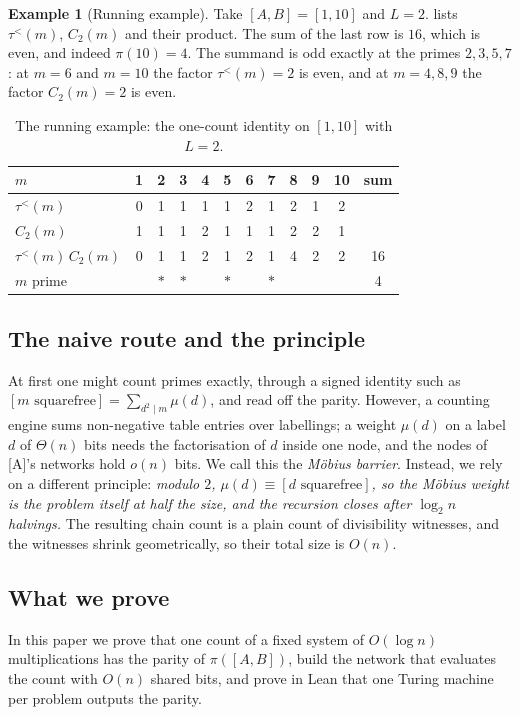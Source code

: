 \documentclass[10pt]{amsart}
\theoremstyle{plain}
\theoremstyle{definition}
\newtheorem{example}[theorem]{Example}
\theoremstyle{remark}
\numberwithin{equation}{section}
\newcommand{\A}{\textup{[A]}}
\newcommand{\tl}{\tau^{<}}
\begin{document}
\begin{example}[Running example]\label{ex:ten}
Take $[A,B]=[1,10]$ and $L=2$.  lists $\tl(m)$, $C_2(m)$ and their product. The sum of
the last row is $16$, which is even, and indeed $\pi(10)=4$. The summand is odd exactly at the primes
$2,3,5,7$: at $m=6$ and $m=10$ the factor $\tl(m)=2$ is even, and at $m=4,8,9$ the factor $C_2(m)=2$
is even.
\end{example}

\begin{table}[ht]
\centering\small
\begin{tabular}{@{}lcccccccccc|c@{}}
\toprule
$m$ & 1 & 2 & 3 & 4 & 5 & 6 & 7 & 8 & 9 & 10 & sum\\
\midrule
$\tl(m)$ & 0 & 1 & 1 & 1 & 1 & 2 & 1 & 2 & 1 & 2 & \\
$C_2(m)$ & 1 & 1 & 1 & 2 & 1 & 1 & 1 & 2 & 2 & 1 & \\
$\tl(m)\,C_2(m)$ & 0 & 1 & 1 & 2 & 1 & 2 & 1 & 4 & 2 & 2 & 16\\
\midrule
$m$ prime & & $\ast$ & $\ast$ & & $\ast$ & & $\ast$ & & & & 4\\
\bottomrule
\end{tabular}
\caption{The running example: the one-count identity on $[1,10]$ with $L=2$.}\label{tab:ten}
\end{table}

\subsection{The naive route and the principle}
At first one might count primes exactly, through a signed identity such as
$[m\text{ squarefree}]=\sum_{d^2\mid m}\mu(d)$, and read off the parity. However, a counting engine
sums non-negative table entries over labellings; a weight $\mu(d)$ on a label $d$ of $\Theta(n)$ bits
needs the factorisation of $d$ inside one node, and the nodes of \A's networks hold $o(n)$ bits. We
call this the \emph{M\"obius barrier}. Instead, we rely on a different principle: \emph{modulo $2$,
$\mu(d)\equiv[d\text{ squarefree}]$, so the M\"obius weight is the problem itself at half the size, and
the recursion closes after $\log_2 n$ halvings.} The resulting chain count is a plain count of
divisibility witnesses, and the witnesses shrink geometrically, so their total size is $O(n)$.

\subsection{What we prove}
In this paper we prove that one count of a fixed system of $O(\log n)$ multiplications has the parity of
$\pi([A,B])$, build the network that evaluates the count with $O(n)$ shared bits, and prove in Lean that
one Turing machine per problem outputs the parity.
\end{document}
